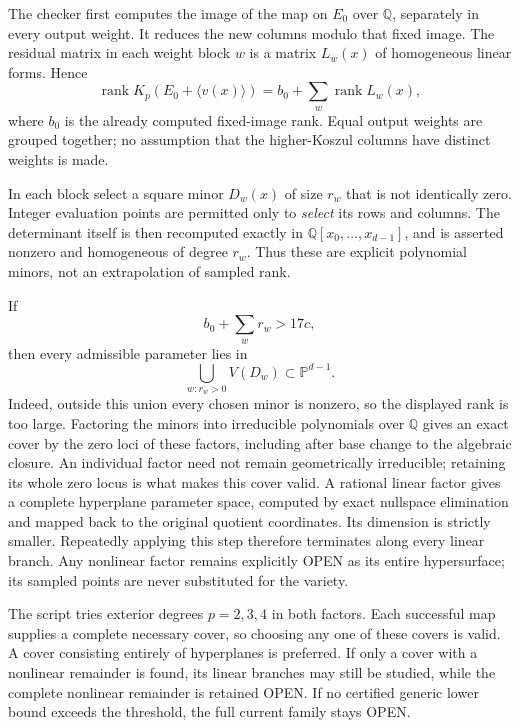 The checker first computes the image of the map on $E_0$ over
$\mathbb Q$, separately in every output weight.  It reduces the new
columns modulo that fixed image.  The residual matrix in each weight
block $w$ is a matrix $L_w(x)$ of homogeneous linear forms.  Hence
\[
 \operatorname{rank}K_p(E_0+\langle v(x)\rangle)
 =b_0+\sum_w\operatorname{rank}L_w(x),
\]
where $b_0$ is the already computed fixed-image rank.  Equal output
weights are grouped together; no assumption that the higher-Koszul
columns have distinct weights is made.

In each block select a square minor $D_w(x)$ of size $r_w$ that is not
identically zero.  Integer evaluation points are permitted only to
\emph{select} its rows and columns.  The determinant itself is then
recomputed exactly in $\mathbb Q[x_0,\ldots,x_{d-1}]$, and is asserted
nonzero and homogeneous of degree $r_w$.  Thus these are explicit
polynomial minors, not an extrapolation of sampled rank.

If
\[
 b_0+\sum_w r_w>17c,
\]
then every admissible parameter lies in
\[
 \bigcup_{w:r_w>0}V(D_w)\subset\mathbb P^{d-1}.
\]
Indeed, outside this union every chosen minor is nonzero, so the displayed
rank is too large.  Factoring the minors into irreducible polynomials over $\mathbb Q$
gives an exact cover by the zero loci of these factors, including after
base change to the algebraic closure.  An individual factor need not
remain geometrically irreducible; retaining its whole zero locus is
what makes this cover valid.  A rational linear factor gives a complete hyperplane parameter
space, computed by exact nullspace elimination and mapped back to the
original quotient coordinates.  Its dimension is strictly smaller.
Repeatedly applying this step therefore terminates along every linear
branch.  Any nonlinear factor remains explicitly OPEN as its entire
hypersurface; its sampled points are never substituted for the variety.

The script tries exterior degrees $p=2,3,4$ in both factors.  Each
successful map supplies a complete necessary cover, so choosing any one
of these covers is valid.  A cover consisting entirely of hyperplanes
is preferred.  If only a cover with a nonlinear remainder is found, its
linear branches may still be studied, while the complete nonlinear
remainder is retained OPEN.  If no certified generic lower bound exceeds
the threshold, the full current family stays OPEN.

